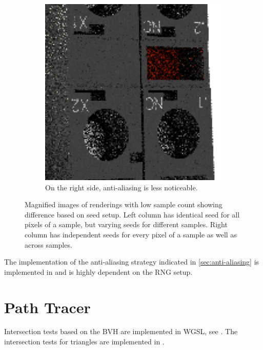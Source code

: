 \begin{figure}[H]
\begin{subfigure}[t]{0.3\textwidth}
        \includegraphics[width=\textwidth]{resources/good-seed-anti-aliasing.png}
        \caption{On the right side, anti-aliasing is less noticeable.}
        \label{fig:rngNoiseArtifactsHighlightsGoodAnti}
    \end{subfigure}
    \hspace*{2cm}
    \caption{Magnified images of renderings with low sample count showing difference based on seed setup. Left column has identical seed for all pixels of a sample, but varying seeds for different samples. Right column has independent seeds for every pixel of a sample as well as across samples.}
    \label{fig:rngNoiseArtifactsHighlights}
\end{figure}

\label{sec:anti-aliasing-implementation}
The implementation of the anti-aliasing strategy indicated in \ref{sec:anti-aliasing} is implemented in  and is highly dependent on the \gls{RNG} setup.

\section{Path Tracer}

Intersection tests based on the \gls{BVH} are implemented in \gls{WGSL}, see . The intersection tests for triangles are implemented in .

